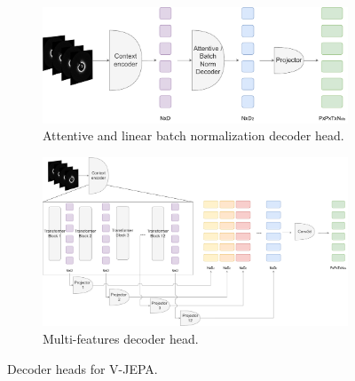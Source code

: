 \documentclass[a4paper,11pt,oneside]{report}
\begin{document}


\begin{figure}[t]
    \centering
    \begin{subfigure}{0.9\textwidth}
        \centering
        \includegraphics[width=0.6\linewidth]{figures/fig_implementation_vjepa_attentive_and_batchnorm_decoder.pdf}
        \caption{Attentive and linear batch normalization decoder head.}
        \label{fig:vjepa-attentive-and-batchnorm-decoder-head}
    \end{subfigure}
    \begin{subfigure}{0.9\textwidth}
        \centering
        \includegraphics[width=1.0\linewidth]{figures/fig_implementation_vjepa_multifeat.pdf}
        \caption{Multi-features decoder head.}
        \label{fig:vjepa-multi-feature-decoder-head}
    \end{subfigure}
    \caption{Decoder heads for V-JEPA.}
\end{figure}
\end{document}
